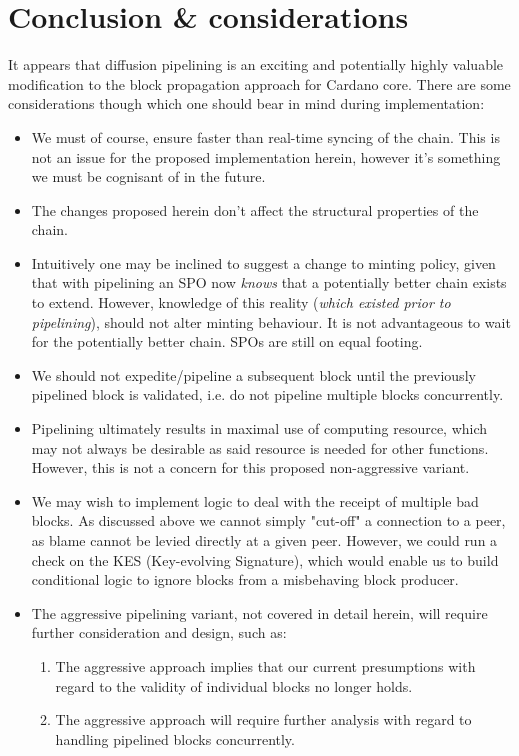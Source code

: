 \documentclass[11pt,a4paper]{article}
\begin{document}
\pagebreak
  
\section{Conclusion \& considerations}
\label{conclusion-and-considerations}
It appears that diffusion pipelining is an exciting and potentially highly valuable 
modification to the block propagation approach for Cardano core. There are some considerations
though which one should bear in mind during implementation:

\begin{itemize}
  \item We must of course, ensure faster than real-time syncing of the chain. This is not an issue for the proposed implementation herein, however it's something we must be cognisant of in the future.
  \item The changes proposed herein don’t affect the structural properties of the chain.
  \item Intuitively one may be inclined to suggest a change to minting policy, given that with pipelining an SPO now \emph{knows} that a potentially better chain exists to extend. However, knowledge of this reality (\emph{which existed prior to pipelining}), should not alter minting behaviour. It is not advantageous to wait for the potentially better chain. SPOs are still on equal footing. 
  \item We should not expedite/pipeline a subsequent block until the previously pipelined block is validated, i.e. do not pipeline multiple blocks concurrently.
  \item Pipelining ultimately results in maximal use of computing resource, which may not always be desirable as said resource is needed for other functions. However, this is not a concern for this proposed non-aggressive variant.
  \item We may wish to implement logic to deal with the receipt of multiple bad blocks. As discussed above we cannot simply "cut-off" a connection to a peer, as blame cannot be levied directly at a given peer. However, we could run a check on the KES (Key-evolving Signature), which would enable us to build conditional logic to ignore blocks from a misbehaving block producer.
  \item The aggressive pipelining variant, not covered in detail herein, will require further consideration and design, such as:
  \begin{enumerate}
    \item The aggressive approach implies that our current presumptions with regard to the validity of individual blocks no longer holds.
    \item The aggressive approach will require further analysis with regard to handling pipelined blocks concurrently. 
  \end{enumerate}
\end{itemize}
\end{document}
